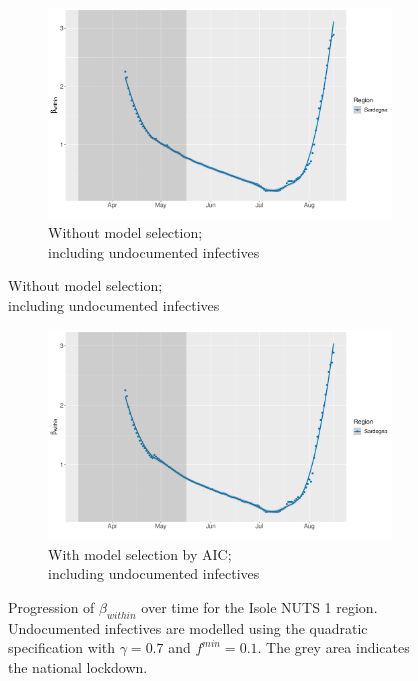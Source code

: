 \documentclass[12pt]{article}
\begin{document}
\begin{appendices}
\begin{figure}[H]
\begin{subfigure}{\textwidth}
    	    \end{subfigure}
    	\end{figure}
        \begin{figure}[H]\ContinuedFloat
    	    \begin{subfigure}{\textwidth}
    	      \centering
    	      \includegraphics[width=0.94\linewidth]{output/model_within_lag14_betawithin_Isole_UndocQuadratic_rollingwindow30.pdf}
    	      \caption{Without model selection; \\ including undocumented infectives}
    	      \label{fig:beta_within_over_time_isole_lowsample_regular_undoc}
    	    \end{subfigure}\newline
        \end{figure}
        \begin{figure}[H]\ContinuedFloat
    	    \begin{subfigure}{\textwidth}
    	      \centering
    	      \includegraphics[width=0.94\linewidth]{output/model_within_lag14_betawithin_Isole_aic_UndocQuadratic_rollingwindow30.pdf}
    	      \caption{With model selection by AIC; \\ including undocumented infectives}
    	      \label{fig:beta_within_over_time_isole_lowsample_aic_undoc}
    	    \end{subfigure}
    	    \caption{Progression of $\beta_{within}$ over time for the Isole NUTS 1 region. Undocumented infectives are modelled using the quadratic specification with $\gamma = 0.7$ and $f^{min}=0.1$. The grey area indicates the national lockdown.}
    	    \label{fig:beta_within_over_time_isole_lowsample}
	    \end{figure}
		

\end{appendices}
\end{document}
